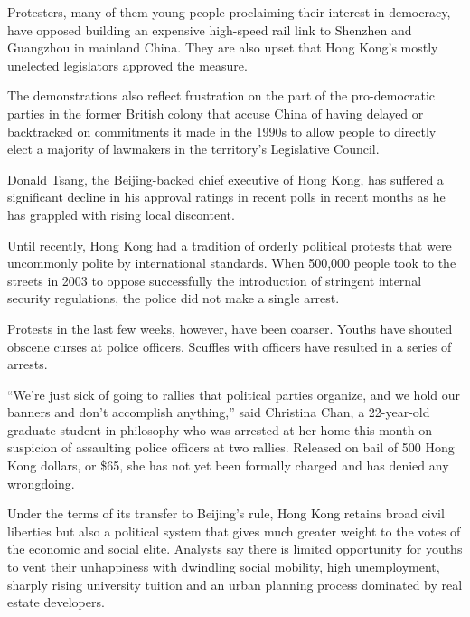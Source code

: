 ﻿\documentclass[12pt]{article}
\begin{document}

Protesters, many of them young people proclaiming their interest in democracy, have opposed building
an expensive high-speed rail link to Shenzhen and Guangzhou in mainland China. They are also upset
that Hong Kong's mostly unelected legislators approved the measure.

The demonstrations also reflect frustration on the part of the pro-democratic parties in the former
British colony that accuse China of having delayed or backtracked on commitments it made in the
1990s to allow people to directly elect a majority of lawmakers in the territory's Legislative
Council.

Donald Tsang, the Beijing-backed chief executive of Hong Kong, has suffered a significant decline in
his approval ratings in recent polls in recent months as he has grappled with rising local
discontent.

Until recently, Hong Kong had a tradition of orderly political protests that were uncommonly polite
by international standards. When 500,000 people took to the streets in 2003 to oppose successfully
the introduction of stringent internal security regulations, the police did not make a single
arrest.

Protests in the last few weeks, however, have been coarser. Youths have shouted obscene curses at
police officers. Scuffles with officers have resulted in a series of arrests.

``We're just sick of going to rallies that political parties organize, and we hold our banners and
don't accomplish anything,'' said Christina Chan, a 22-year-old graduate student in philosophy who
was arrested at her home this month on suspicion of assaulting police officers at two rallies.
Released on bail of 500 Hong Kong dollars, or \$65, she has not yet been formally charged and has
denied any wrongdoing.

Under the terms of its transfer to Beijing's rule, Hong Kong retains broad civil liberties but also
a political system that gives much greater weight to the votes of the economic and social elite.
Analysts say there is limited opportunity for youths to vent their unhappiness with dwindling social
mobility, high unemployment, sharply rising university tuition and an urban planning process
dominated by real estate developers.
\end{document}
